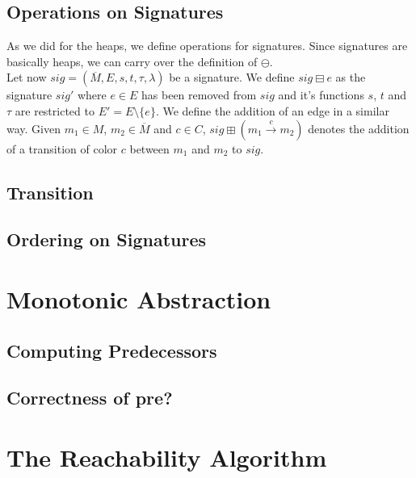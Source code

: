 \subsection{Operations on Signatures}
As we did for the heaps, we define operations for signatures. Since signatures are basically heaps, we
can carry over the definition of $\ominus$.\\
Let now $sig = (\overline{M}, E, s, t, \tau, \lambda)$ be a signature. 
We define $sig \boxminus e$ as the signature $sig'$ where $e \in E$ has been removed from $sig$ and it's functions 
$s$, $t$ and $\tau$ are restricted to $E' = E\setminus\{e\}$. We define the addition of an edge in a similar way.
Given $m_1 \in M$, $m_2 \in \overline{M}$ and $c \in C$, $sig \boxplus (m_1 \xrightarrow{c} m_2)$ denotes the addition
of a transition of color $c$ between $m_1$ and $m_2$ to $sig$.


\subsection{Transition}



\subsection{Ordering on Signatures}

\section{Monotonic Abstraction}

\subsection{Computing Predecessors}

\subsection{Correctness of pre?}

\section{The Reachability Algorithm}



